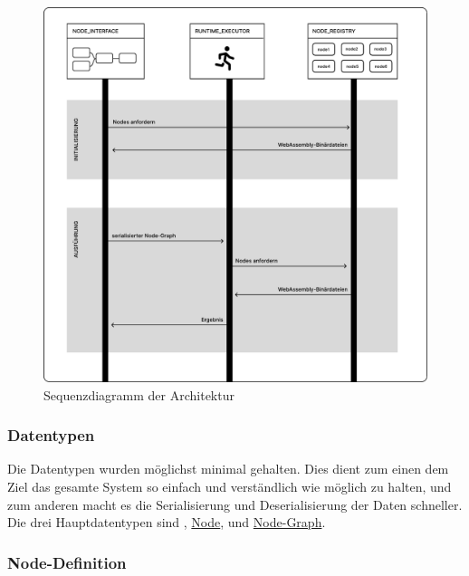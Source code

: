 \documentclass[ngerman]{article}
\begin{document}
\begin{figure}[hbtp]
    \centering
    \includegraphics[width=1\textwidth]{graphics/OVERVIEW_SEQUENCE.pdf}
    \caption{Sequenzdiagramm der Architektur}
    \label{fig:overview_sequence}
\end{figure}

\pagebreak

\subsubsection{Datentypen}

Die Datentypen wurden möglichst minimal gehalten. Dies dient zum einen dem Ziel das gesamte System so einfach und verständlich wie möglich zu halten, und zum
anderen macht es die Serialisierung und Deserialisierung der Daten schneller.
\br
Die drei Hauptdatentypen sind  , \hyperref[fig:data_node]{Node},  und \hyperref[fig:data_node_graph]{Node-Graph}. 

\subsubsection*{Node-Definition}
\end{document}
